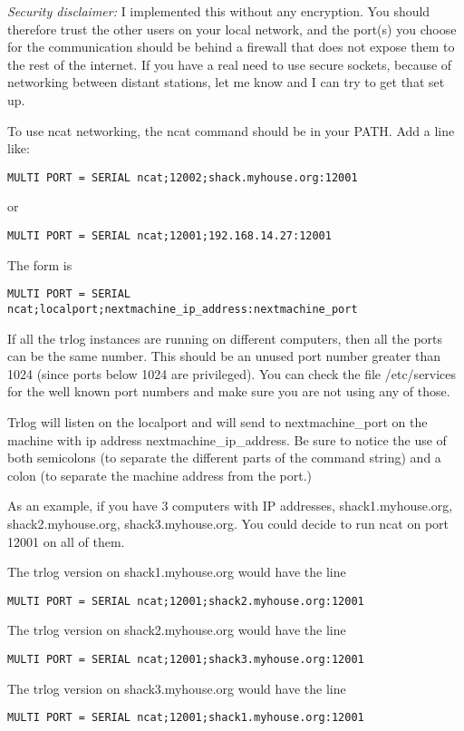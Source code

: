 \documentclass[12pt]{article}
\begin{document}
{\em Security disclaimer:} I implemented this without any encryption.
You should therefore trust the other users on your local network,
and the port(s) you choose for the communication should be behind
a firewall that does not expose them to the rest of the internet.
If you have a real need to use secure sockets, because of networking
between distant stations, let me know and I can try to get that
set up. 

To use ncat networking, the ncat command should be in your PATH.
Add a line like:
\begin{verbatim}
MULTI PORT = SERIAL ncat;12002;shack.myhouse.org:12001
\end{verbatim}
or
\begin{verbatim}
MULTI PORT = SERIAL ncat;12001;192.168.14.27:12001
\end{verbatim}

The form is
\begin{verbatim}
MULTI PORT = SERIAL ncat;localport;nextmachine_ip_address:nextmachine_port
\end{verbatim}

If all the trlog instances are running on different computers, then
all the ports can be the same number. This should be an unused port
number greater than 1024 (since ports below 1024 are privileged).
You can check the file /etc/services for the well known port numbers
and make sure you are not using any of those.

Trlog will listen on the localport and will send to nextmachine\_port
on the machine with ip address nextmachine\_ip\_address. Be sure
to notice the use of both semicolons (to separate the different
parts of the command string) and a colon (to separate the machine
address from the port.)

As an example, if you have 3 computers with IP addresses,
shack1.myhouse.org, shack2.myhouse.org, shack3.myhouse.org. You could
decide to run ncat on port 12001 on all of them.

The trlog version on shack1.myhouse.org would have the line
\begin{verbatim}
MULTI PORT = SERIAL ncat;12001;shack2.myhouse.org:12001
\end{verbatim}

The trlog version on shack2.myhouse.org would have the line
\begin{verbatim}
MULTI PORT = SERIAL ncat;12001;shack3.myhouse.org:12001
\end{verbatim}

The trlog version on shack3.myhouse.org would have the line
\begin{verbatim}
MULTI PORT = SERIAL ncat;12001;shack1.myhouse.org:12001
\end{verbatim}
\end{document}
